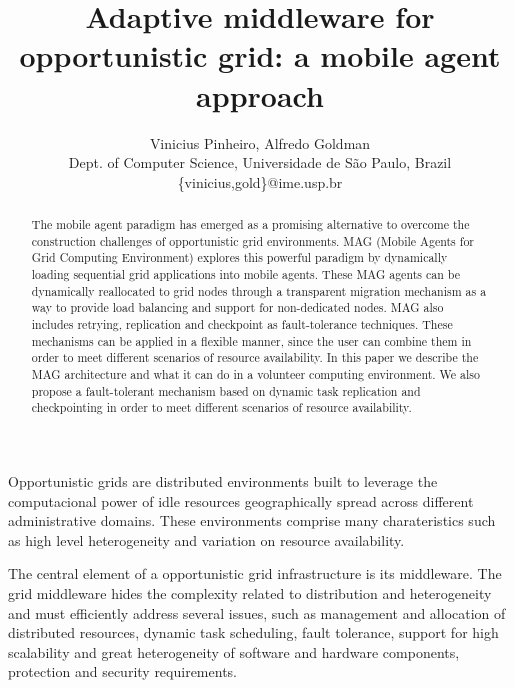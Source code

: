 \documentclass[times, 10pt, twocolumn]{article}
\begin{document}
\title{Adaptive middleware for opportunistic grid: a mobile agent approach}

\author{Vinicius Pinheiro, Alfredo Goldman\\
Dept. of Computer Science, Universidade de S\~ao Paulo, Brazil\\
\{vinicius,gold\}@ime.usp.br}

\maketitle
\thispagestyle{empty}

\begin{abstract}

The mobile agent paradigm has emerged as a promising alternative to overcome the
construction challenges of opportunistic grid environments. MAG (Mobile Agents
for Grid Computing Environment) explores this powerful paradigm by dynamically
loading sequential grid applications into mobile agents. These MAG agents can
be dynamically reallocated to grid nodes through a transparent migration
mechanism as a way to provide load balancing and support for non-dedicated
nodes. MAG also includes retrying, replication and checkpoint as
fault-tolerance techniques. These mechanisms can be applied in a flexible
manner, since the user can combine them in order to meet different scenarios of
resource availability. In this paper we describe the MAG architecture and what
it can do in a volunteer computing environment. We also propose a
fault-tolerant mechanism based on dynamic task replication and checkpointing in
order to meet different scenarios of resource availability. 
\end{abstract}



Opportunistic grids are distributed environments built to leverage the
computacional power of idle resources geographically spread across different
administrative domains. These environments comprise many charateristics such as
high level heterogeneity and variation on resource availability. 

The central element of a opportunistic grid infrastructure is its middleware.
The grid middleware hides the complexity related to distribution and
heterogeneity and must efficiently address several issues, such as management
and allocation of distributed resources, dynamic task scheduling, fault
tolerance, support for high scalability and great heterogeneity of software and
hardware components, protection and security requirements.
 
\end{document}
